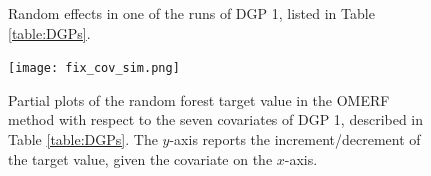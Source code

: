 \begin{figure}[H]
    \centering
    \quad
    \caption[]{Random effects in one of the runs of DGP 1, listed in Table \ref{table:DGPs}.}
    \label{fig:ranefDGP1}
\end{figure}


\begin{figure}[H]
    \centering
    \texttt{[image: fix\_cov\_sim.png]}
    \caption{Partial plots of the random forest target value in the OMERF method with respect to the seven covariates of DGP 1, described in Table \ref{table:DGPs}. The \(y\)-axis reports the increment/decrement of the target value, given the covariate on the \(x\)-axis.}
    \label{fig:fix_cov_DGP1}
\end{figure}

